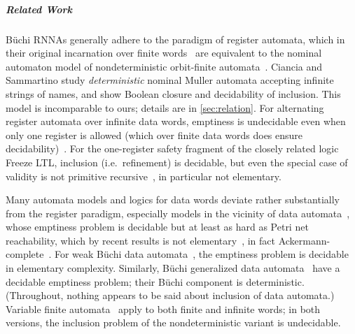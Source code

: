 \documentclass[10pt,a4paper]{amsart}
\numberwithin{equation}{section}
\newcommand{\+}[1]{\mathcal{#1}\xspace}
\theoremstyle{definition}
\begin{document}
\subparagraph*{Related Work} B\"uchi RNNAs generally adhere to the
paradigm of register automata, which in their original incarnation
over finite words~\cite{KaminskiFrancez94} are equivalent to the
nominal automaton model of nondeterministic orbit-finite
automata~\cite{BojanczykEA14}. Ciancia and Sammartino
\cite{CianciaSammartino14} study \emph{deterministic} nominal Muller
automata accepting %
infinite strings of names, and show %
Boolean closure and decidability of inclusion. This model is
incomparable to ours; details are in \autoref{sec:relation}. For
alternating register automata over infinite data words, emptiness is
undecidable even when only one register is allowed (which over finite
data words does ensure decidability)~\cite{DemriLazic09}. For the
one-register safety fragment of the closely related logic Freeze LTL,
inclusion (i.e.~refinement) is decidable, but even the special case of
validity is not primitive recursive~\cite{Lazic06}, in particular not
elementary.

Many automata models and logics for data words deviate rather
substantially from the register paradigm, especially models in the
vicinity of data automata~\cite{BojanczykEA11}, whose emptiness
problem is decidable but at least as hard as Petri net reachability,
which by recent results is not elementary~\cite{CzerwinskiEA21}, in
fact Ackermann-complete~\cite{Leroux21,CzerwinskiOrlikowski21}. For
weak B\"uchi data automata~\cite{KaraEA12}, the emptiness problem is
decidable in elementary complexity. Similarly, Büchi generalized data
automata~\cite{ColcombetManuel14} have a decidable emptiness problem;
their B\"uchi component is deterministic. (Throughout, nothing appears
to be said about inclusion of data automata.) Variable finite
automata~\cite{GrumbergEA10} apply to both finite and infinite words;
in both versions, the inclusion problem of the nondeterministic
variant is undecidable.
\end{document}

